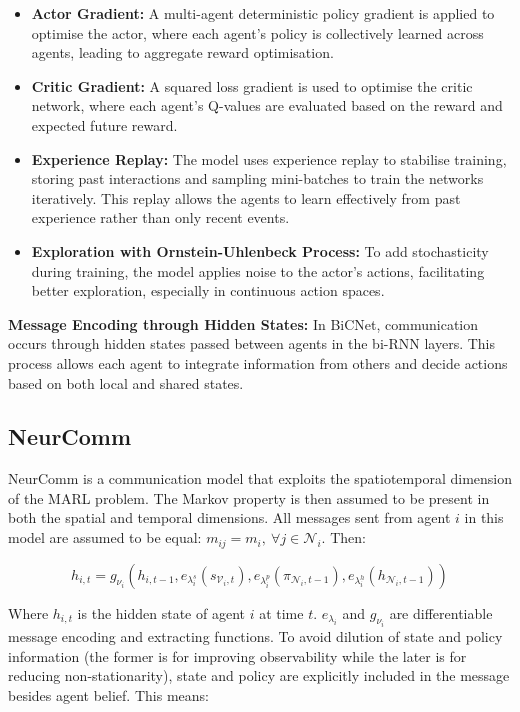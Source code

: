 \documentclass{article}
\begin{document}
\begin{itemize}
    \item \textbf{Actor Gradient:} A multi-agent deterministic policy gradient is applied to optimise the actor, where each agent’s policy is collectively learned across agents, leading to aggregate reward optimisation.
    
    \item \textbf{Critic Gradient:} A squared loss gradient is used to optimise the critic network, where each agent’s Q-values are evaluated based on the reward and expected future reward.
    
    \item \textbf{Experience Replay:} The model uses experience replay to stabilise training, storing past interactions and sampling mini-batches to train the networks iteratively. This replay allows the agents to learn effectively from past experience rather than only recent events.
    
    \item \textbf{Exploration with Ornstein-Uhlenbeck Process:} To add stochasticity during training, the model applies noise to the actor's actions, facilitating better exploration, especially in continuous action spaces.
\end{itemize}

\textbf{Message Encoding through Hidden States:} In BiCNet, communication occurs through hidden states passed between agents in the bi-RNN layers. This process allows each agent to integrate information from others and decide actions based on both local and shared states.

\subsection{NeurComm}

NeurComm \citep{chu2020NeurComm} is a communication model that exploits the spatiotemporal dimension of the MARL problem. The Markov property is then assumed to be present in both the spatial and temporal dimensions. All messages sent from agent $i$ in this model are assumed to be equal: $m_{ij} = m_i, \ \forall j \in \mathcal{N}_i$. Then:

\begin{equation}
	h_{i, t} = g_{\nu_i} (h_{i, t-1}, e_{\lambda_i^s}(s_{\mathcal{V}_i, t}), e_{\lambda_i^p}(\pi_{\mathcal{N}_i, t-1}), e_{\lambda_i^h}(h_{\mathcal{N}_i, t-1}))
\end{equation}

Where $h_{i, t}$ is the hidden state of agent $i$ at time $t$. $e_{\lambda_i}$ and $g_{\nu_i}$ are differentiable message encoding and extracting functions. To avoid dilution of state and policy information (the former is for improving observability while the later is for reducing non-stationarity), state and policy are explicitly included in the message besides agent belief. This means:
\end{document}
